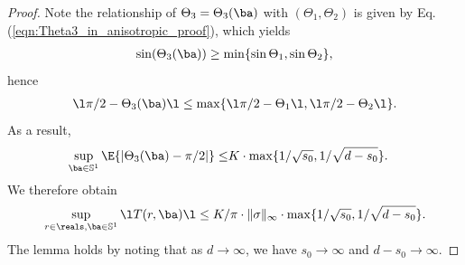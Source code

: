 \documentclass[11pt]{article}
\begin{document}
\begin{proof}
Note the relationship of $\Theta_3 = \Theta_3(\ba)$ with $(\Theta_1, \Theta_2)$ is given by Eq. (\ref{eqn:Theta3_in_anisotropic_proof}), which yields 
\begin{align}
\sin(\Theta_3(\ba)) \ge \min\{ \sin\Theta_1, \sin \Theta_2 \},
\end{align}
hence
\begin{align}
\l \pi /2 - \Theta_3(\ba) \l \le \max\{ \l \pi /2 - \Theta_1 \l, \l \pi /2 - \Theta_2 \l \}. 
\end{align}
As a result, 
\begin{align}
\sup_{\ba \in \mathbb S^1}\E\{|\Theta_3(\ba)-\pi/2|\} \le& K \cdot \max\{ 1/\sqrt{s_0}, 1 / \sqrt{d - s_0} \}.
\end{align}
We therefore obtain 
\begin{align}
\sup_{r \in \reals, \ba \in \mathbb S^1} \l T(r, \ba) \l \le K / \pi \cdot \|\sigma\|_{\infty} \cdot \max\{ 1/\sqrt{s_0}, 1/ \sqrt{d - s_0} \}.
\end{align}
The lemma holds by noting that as $d \to \infty$, we have $s_0 \to \infty$ and $d - s_0 \to \infty$.
\end{proof}
%
%
%
\end{document}
